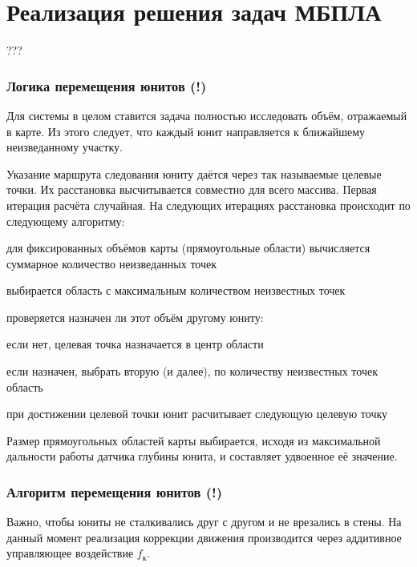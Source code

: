 \section{Реализация решения задач МБПЛА}

???

\newpage
\subsubsection{Логика перемещения юнитов (!)}

Для системы в целом ставится задача полностью исследовать объём, отражаемый в карте.
Из этого следует, что каждый юнит направляется к ближайшему неизведанному участку.

Указание маршрута следования юниту даётся через так называемые целевые точки.
Их расстановка высчитывается совместно для всего массива. Первая итерация расчёта
случайная. На следующих итерациях расстановка происходит по следующему алгоритму:
\begin{mintemize}
\item для фиксированных объёмов карты (прямоугольные области) вычисляется суммарное
    количество неизведанных точек
\item выбирается область с максимальным количеством неизвестных точек
\item проверяется назначен ли этот объём другому юниту:
    \begin{mintemize}
        \item если нет, целевая точка назначается в центр области
        \item если назначен, выбрать вторую (и далее), по количеству неизвестных точек область
    \end{mintemize}
\item при достижении целевой точки юнит расчитывает следующую целевую точку
\end{mintemize}

Размер прямоугольных областей карты выбирается, исходя из максимальной дальности работы
датчика глубины юнита, и составляет удвоенное её значение.

\newpage
\subsubsection{Алгоритм перемещения юнитов (!)}

Важно, чтобы юниты не сталкивались друг с другом и не врезались в стены.
На данный момент реализация коррекции движения производится через аддитивное управляющее
воздействие $f_{\text{к}}$. 

